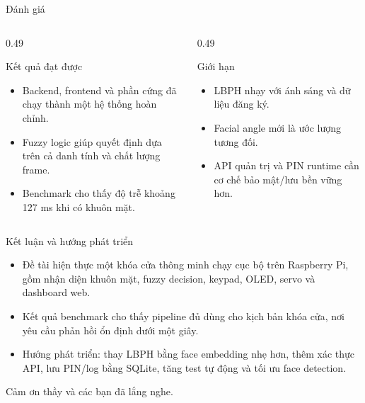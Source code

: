 \documentclass[aspectratio=169,11pt]{beamer}
\begin{document}
\begin{frame}{Đánh giá}
    \begin{columns}[T]
        \begin{column}{0.49\textwidth}
            \begin{block}{Kết quả đạt được}
                \begin{itemize}
                    \item Backend, frontend và phần cứng đã chạy thành một hệ thống hoàn chỉnh.
                    \item Fuzzy logic giúp quyết định dựa trên cả danh tính và chất lượng frame.
                    \item Benchmark cho thấy độ trễ khoảng 127 ms khi có khuôn mặt.
                \end{itemize}
            \end{block}
        \end{column}
        \begin{column}{0.49\textwidth}
            \begin{block}{Giới hạn}
                \begin{itemize}
                    \item LBPH nhạy với ánh sáng và dữ liệu đăng ký.
                    \item Facial angle mới là ước lượng tương đối.
                    \item API quản trị và PIN runtime cần cơ chế bảo mật/lưu bền vững hơn.
                \end{itemize}
            \end{block}
        \end{column}
    \end{columns}
\end{frame}

\begin{frame}{Kết luận và hướng phát triển}
    \begin{itemize}
        \item Đề tài hiện thực một khóa cửa thông minh chạy cục bộ trên Raspberry Pi, gồm nhận diện khuôn mặt, fuzzy decision, keypad, OLED, servo và dashboard web.
        \item Kết quả benchmark cho thấy pipeline đủ dùng cho kịch bản khóa cửa, nơi yêu cầu phản hồi ổn định dưới một giây.
        \item Hướng phát triển: thay LBPH bằng face embedding nhẹ hơn, thêm xác thực API, lưu PIN/log bằng SQLite, tăng test tự động và tối ưu face detection.
    \end{itemize}

    \vspace{7mm}
    \begin{center}
        \Large Cảm ơn thầy và các bạn đã lắng nghe.
    \end{center}
\end{frame}
\end{document}
